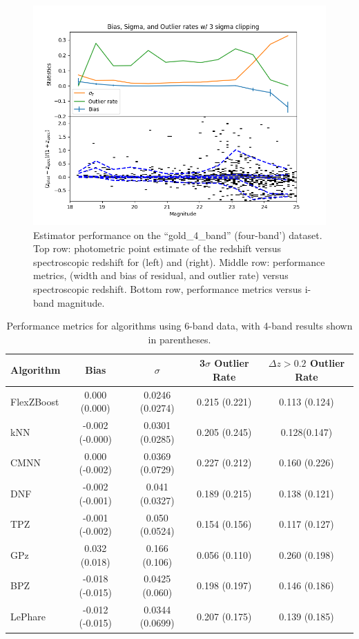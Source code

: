 \begin{figure}
    \includegraphics[width=0.45\linewidth]{figures/biweight_stats_v_mag_knn_4.png}    
    \caption{Estimator performance on the ``gold\_4\_band'' (four-band') dataset.  Top row: photometric point estimate of the redshift versus spectroscopic redshift for  (left) and  (right).   Middle row: performance metrics, (width and bias of residual, and outlier rate) versus spectroscopic redshift.    Bottom row, performance metrics versus i-band magnitude.}
    \label{fig:perf_gold_4_band}
\end{figure}

\begin{table}[ht]
\centering
\caption{Performance metrics for \photoz algorithms using 6-band data, with 4-band results shown in parentheses.}
\begin{tabular}{lcccc}
\hline
\textbf{Algorithm} & \textbf{Bias} & \textbf{$\sigma$} & \textbf{3$\sigma$ Outlier Rate} & \textbf{$\Delta z>0.2$ Outlier Rate} \\
\hline
FlexZBoost & 0.000 (0.000) & 0.0246 (0.0274) & 0.215 (0.221) & 0.113 (0.124) \\
kNN        & -0.002 (-0.000) & 0.0301 (0.0285) & 0.205 (0.245) & 0.128(0.147) \\
CMNN       & 0.000 (-0.002) & 0.0369 (0.0729) & 0.227 (0.212) & 0.160 (0.226) \\
DNF        & -0.002 (-0.001) & 0.041 (0.0327) & 0.189 (0.215) & 0.138 (0.121) \\
TPZ        & -0.001 (-0.002) & 0.050 (0.0524) & 0.154 (0.156) & 0.117 (0.127) \\
GPz        & 0.032 (0.018) & 0.166 (0.106) & 0.056 (0.110) & 0.260 (0.198) \\
BPZ        & -0.018 (-0.015) & 0.0425 (0.060) & 0.198 (0.197) & 0.146 (0.186) \\
LePhare    & -0.012 (-0.015) & 0.0344 (0.0699) & 0.207 (0.175) & 0.139 (0.185) \\
\hline
\end{tabular}
\label{tab:photoz_metrics}
\end{table}



